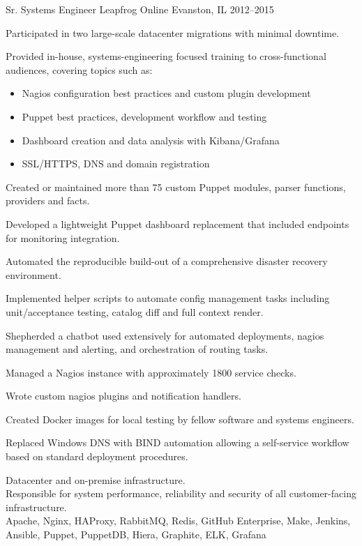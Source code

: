 \begin{cventries}
  \cventry
    {Sr. Systems Engineer} %
    {Leapfrog Online} %
    {Evanston, IL} %
    {2012--2015} %
    {
      \begin{cvitems} %
        \item {Participated in two large-scale datacenter migrations with minimal downtime.}
        \item {Provided in-house, systems-engineering focused training to cross-functional audiences, covering topics such as:
          \begin{itemize}[leftmargin=*,label={\bullet}]
              \item Nagios configuration best practices and custom plugin development
              \item Puppet best practices, development workflow and testing
              \item Dashboard creation and data analysis with Kibana/Grafana
              \item SSL/HTTPS, DNS and domain registration
          \end{itemize}
        }
        \item {Created or maintained more than 75 custom Puppet modules, parser functions, providers and facts.}
        \item {Developed a lightweight Puppet dashboard replacement that included endpoints for monitoring integration.}
        \item {Automated the reproducible build-out of a comprehensive disaster recovery environment.}
        \item {Implemented helper scripts to automate config management tasks including unit/acceptance testing, catalog diff and full context render.}
        \item {Shepherded a chatbot used extensively for automated deployments, nagios management and alerting, and orchestration of routing tasks.}
        \item {Managed a Nagios instance with approximately 1800 service checks.}
        \item {Wrote custom nagios plugins and notification handlers.}
        \item {Created Docker images for local testing by fellow software and systems engineers.}
        \item {Replaced Windows DNS with BIND automation allowing a self-service workflow based on standard deployment procedures.}
      \end{cvitems}
    }
    {
      \begin{cventrysummary}
        Datacenter and on-premise infrastructure. \\
        Responsible for system performance, reliability and security of all customer-facing infrastructure. \\
        Apache, Nginx, HAProxy, RabbitMQ, Redis, GitHub Enterprise, Make, Jenkins, Ansible, Puppet, PuppetDB, Hiera, Graphite, ELK, Grafana
      \end{cventrysummary}
    }


\end{cventries}
